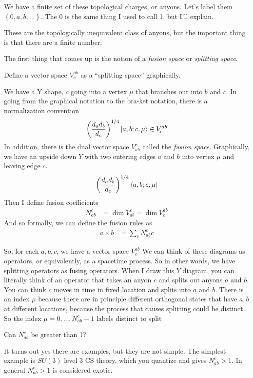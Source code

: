We have a finite set of these topological charges, or anyons.
Let's label them
$\left\{ 0,a,b,\ldots \right\}$.
The 0 is the same thing I used to call 1,
but I'll explain.

These are the topologically inequivalent class of anyons,
but the important thing is that there are a finite number.

The first thing that comes up is the notion of a \emph{fusion space}
or \emph{splitting space}.

Define a vector space $V_c^{ab}$ as a ``splitting space'' graphically.

We have a Y shape, $c$ going into a vertex $\mu$ that branches out into $b$ and
$c$.
In going from the graphical notation to the bra-ket notation,
there is a normalization convention 
\begin{align}
    \left( \frac{d_a d_b}{d_c} \right)^{1/4}
    \ket{a,b;c,\mu}
    \in V_c^{ab}
\end{align}
In addition,
there is the dual vector space $V^{c}_{ab}$
called the \emph{fusion space}.
Graphically,
we have an upside down $Y$ with two entering edges $a$ and $b$
into vertex $\mu$ and leaving edge $c$.
\begin{align}
    \left( 
    \frac{d_a d_b}{d_c}
    \right)^{1/4}
    \bra{a,b;c,\mu}
\end{align}
Then I define fusion coefficients
\begin{align}
    N_{ab}^{c}
    &=
    \dim V_{ab}^{c}
    =
    \dim V_{c}^{ab}
\end{align}
And so formally,
we can define the fusion rules as
\begin{align}
    a\times b
    &=
    \sum_{c}
    N_{ab}^{c} c
\end{align}

So,
for each $a,b,c$,
we have a vector space $V^{ab}_{c}$
We can think of these diagrams as operators,
or equivalently,
as a spacetime process.
So in other words,
we have splitting operators as fusing operators.
When I draw this $Y$ diagram,
you can literally think of an operator that takes an anyon $c$
and splits out anyons $a$ and $b$.
You can think $c$ moves in time in fixed location and splits into $a$ and $b$.
There is an index $\mu$ because there are in principle different orthogonal
states that have $a,b$ at different locations,
because the process that causes splitting could be distinct.
So the index $\mu=0,\ldots,N_{ab}^{c} - 1$
labels distinct to split

\begin{question}
    Can $N_{ab}^c$ be greater than 1?
\end{question}
It turns out yes there are examples,
but they are not simple.
The simplest example is $SU(3)$ level 3 CS theory,
which you quantize and gives $N_{ab}^{c}>1$.
In general $N_{ab}^{c}>1$ is considered exotic.

